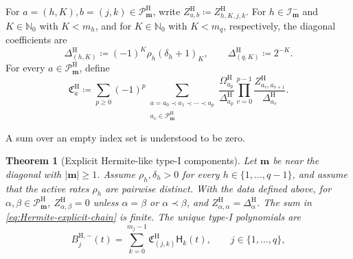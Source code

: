 \documentclass[10pt]{amsart}
\newcommand{\Nzero}{\mathbb N_0}
\newcommand{\mm}{\boldsymbol m}
\newcommand{\abs}[1]{\lvert#1\rvert}
\theoremstyle{plain}
\newtheorem{theorem}{Theorem}[section]
\theoremstyle{definition}
\theoremstyle{remark}
\begin{document}
For \(a=(h,K),b=(j,k)\in\mathscr P_{\mm}^{\mathrm H}\), write
\(Z_{a,b}^{\mathrm H}\coloneq Z_{h,K,j,k}^{\mathrm H}\).
For \(h\in\mathcal I_{\mm}^-\) and
\(K\in\Nzero\) with \(K<m_h\), and for \(K\in\Nzero\) with
\(K<m_q\), respectively, the diagonal coefficients are
\begin{equation}
 \Delta_{(h,K)}^{\mathrm H}
 \coloneq(-1)^K\rho_h(\delta_h+1)_K,
 \qquad
 \Delta_{(q,K)}^{\mathrm H}
 \coloneq2^{-K}.
 \label{eq:Hermite-explicit-pivots}
\end{equation}
For every \(a\in\mathscr P_{\mm}^{\mathrm H}\), define
\begin{equation}
 \mathfrak C_a^{\mathrm H}
 \coloneq\sum_{p\ge0}(-1)^p
 \sum_{\substack{a=a_0\prec a_1\prec\cdots\prec a_p\\
                 a_v\in\mathscr P_{\mm}^{\mathrm H}}}
 \frac{\Omega_{a_p}^{\mathrm H}}{\Delta_{a_p}^{\mathrm H}}
 \prod_{v=0}^{p-1}
 \frac{Z_{a_v,a_{v+1}}^{\mathrm H}}
      {\Delta_{a_v}^{\mathrm H}}.
 \label{eq:Hermite-explicit-chain}
\end{equation}

A sum over an empty index set is understood to be zero.

\begin{theorem}[Explicit Hermite-like type-I components]
\label{thm:explicit-Hermite-B}
Let \(\mm\) be near the diagonal with \(\abs\mm\ge1\). Assume
\(\rho_h,\delta_h>0\) for every
\(h\in\{1,\ldots,q-1\}\), and assume that the active rates \(\rho_h\)
are pairwise distinct. With the data defined above, for
\(\alpha,\beta\in\mathscr P_{\mm}^{\mathrm H}\),
\(Z_{\alpha,\beta}^{\mathrm H}=0\) unless
\(\alpha=\beta\) or \(\alpha\prec\beta\), and
\(Z_{\alpha,\alpha}^{\mathrm H}=\Delta_\alpha^{\mathrm H}\). The sum in
\eqref{eq:Hermite-explicit-chain} is finite. The unique type-I
polynomials are
\begin{equation}
 B_j^{\mathrm H,-}(t)
 =\sum_{k=0}^{m_j-1}
 \mathfrak C_{(j,k)}^{\mathrm H}\mathsf H_k(t),
 \qquad j\in\{1,\ldots,q\},
 \label{eq:explicit-Hermite-minus-components}
\end{equation}
\end{theorem}
\end{document}
